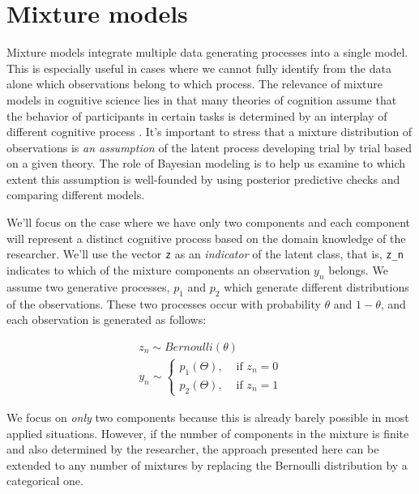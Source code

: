 \documentclass[12pt,]{krantz}
\theoremstyle{definition}
\theoremstyle{definition}
\theoremstyle{definition}
\theoremstyle{remark}
\begin{document}
\hypertarget{ch:mixture}{%
\chapter{Mixture models}\label{ch:mixture}}

Mixture models integrate multiple data generating processes into a single model. This is especially useful in cases where we cannot fully identify from the data alone which observations belong to which process.
The relevance of mixture models in cognitive science lies in that many theories of cognition assume that the behavior of participants in certain tasks is determined by an interplay of different cognitive process \citetext{\citealp[e.g., reaction times in schizophrenia in][]{levy1993eye}; \citealp[retrieval from memory in sentence processing in][]{Mcelree2000}; \citealp{nicenboimModelsRetrievalSentence2018}; \citealp[fast choices in][]{Ollman1966}; \citealp{DutilhEtAl2011}}. It's important to stress that a mixture distribution of observations is \emph{an assumption} of the latent process developing trial by trial based on a given theory. The role of Bayesian modeling is to help us examine to which extent this assumption is well-founded by using posterior predictive checks and comparing different models.

We'll focus on the case where we have only two components and each component will represent a distinct cognitive process based on the domain knowledge of the researcher. We'll use the vector \texttt{z} as an \emph{indicator} of the latent class, that is, \texttt{z\_n} indicates to which of the mixture components an observation \(y_n\) belongs. We assume two generative processes, \(p_1\) and \(p_2\) which generate different distributions of the observations. These two processes occur with probability \(\theta\) and \(1-\theta\), and each observation is generated as follows:

\begin{equation}
\begin{aligned}
z_n \sim Bernoulli(\theta)\\
y_n \sim 
\begin{cases}
p_1(\Theta), & \text{ if } z_n =0 \\
p_2(\Theta), & \text{ if } z_n=1
\end{cases}
\end{aligned}
\end{equation}

We focus on \emph{only} two components because this is already barely possible in most applied situations. However, if
the number of components in the mixture is finite and also determined by the researcher, the approach presented here can be extended to any number of mixtures by replacing the Bernoulli distribution by a categorical one.
\end{document}
